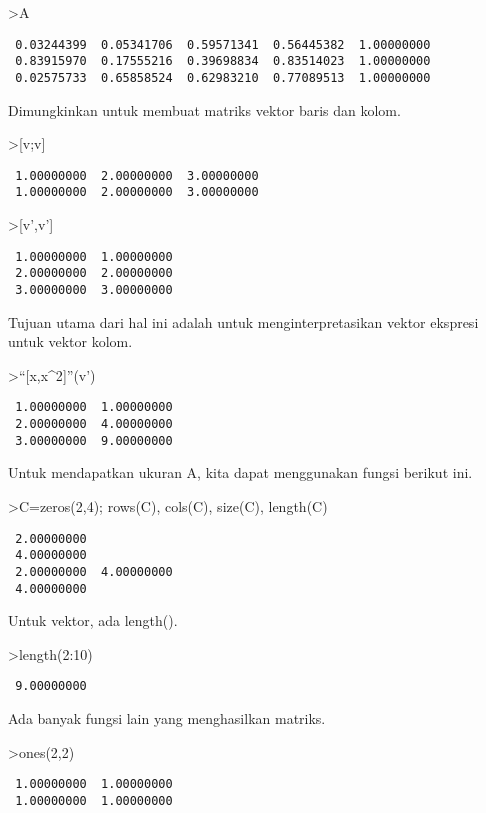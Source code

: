 \documentclass[
]{book}
\begin{document}
\textgreater A

\begin{verbatim}
 0.03244399  0.05341706  0.59571341  0.56445382  1.00000000 
 0.83915970  0.17555216  0.39698834  0.83514023  1.00000000 
 0.02575733  0.65858524  0.62983210  0.77089513  1.00000000 
\end{verbatim}

Dimungkinkan untuk membuat matriks vektor baris dan kolom.

\textgreater{[}v;v{]}

\begin{verbatim}
 1.00000000  2.00000000  3.00000000 
 1.00000000  2.00000000  3.00000000 
\end{verbatim}

\textgreater{[}v',v'{]}

\begin{verbatim}
 1.00000000  1.00000000 
 2.00000000  2.00000000 
 3.00000000  3.00000000 
\end{verbatim}

Tujuan utama dari hal ini adalah untuk menginterpretasikan vektor ekspresi untuk vektor kolom.

\textgreater{}``{[}x,x\^{}2{]}''(v')

\begin{verbatim}
 1.00000000  1.00000000 
 2.00000000  4.00000000 
 3.00000000  9.00000000 
\end{verbatim}

Untuk mendapatkan ukuran A, kita dapat menggunakan fungsi berikut ini.

\textgreater C=zeros(2,4); rows(C), cols(C), size(C), length(C)

\begin{verbatim}
 2.00000000 
 4.00000000 
 2.00000000  4.00000000 
 4.00000000 
\end{verbatim}

Untuk vektor, ada length().

\textgreater length(2:10)

\begin{verbatim}
 9.00000000 
\end{verbatim}

Ada banyak fungsi lain yang menghasilkan matriks.

\textgreater ones(2,2)

\begin{verbatim}
 1.00000000  1.00000000 
 1.00000000  1.00000000 
\end{verbatim}
\end{document}
